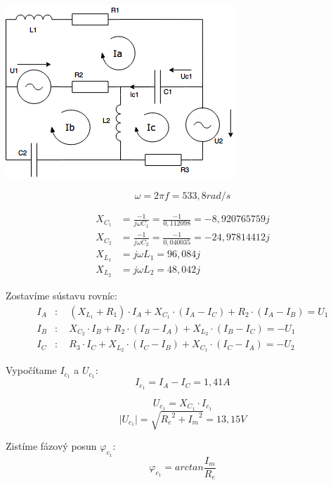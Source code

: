 \documentclass[a4paper,11pt,titlepage]{article}
\begin{document}
\vspace{5mm}

\includegraphics[scale=0.7]{diagra.png}

\vspace{5mm}

\[\omega = 2 \pi f = 533,8 rad/s\]

\begin{align*}
X_{C_1} &= \frac{-1}{j\omega C_1} = \frac{-1}{0,112098} = -8,920765759j \\[10pt]
X_{C_2} &= \frac{-1}{j\omega C_2} = \frac{-1}{0,040035} = -24,97814412j \\[20pt]
X_{L_1} &= j\omega L_1 = 96,084j \\[10pt]
X_{L_2} &= j\omega L_2 = 48,042j
\end{align*}

\vspace{5mm}

Zostavíme sústavu rovníc:
\begin{align*}
I_A &: \quad (X_{L_1} + R_1) \cdot I_A + X_{C_1} \cdot (I_A - I_C) + R_2 \cdot (I_A - I_B) = U_1 \\
I_B &: \quad X_{C_2} \cdot I_B + R_2 \cdot (I_B - I_A) + X_{L_2} \cdot (I_B - I_C) = -U_1 \\
I_C &: \quad R_3 \cdot I_C + X_{L_2} \cdot (I_C - I_B) + X_{C_1} \cdot (I_C - I_A) = -U_2
\end{align*}

\vspace{5mm}

Vypočítame $I_{c_1}$ a $U_{c_1}$:
\[I_{c_1} = I_A - I_C = 1,41A\]

\[U_{c_1} = X_{C_1} \cdot I_{c_1}\]
\[\mid U_{c_1} \mid = \sqrt{{R_e}^2 + {I_m}^2} = 13,15V\]

\vspace{5mm}

Zistíme fázový posun $\varphi_{c_1}$:
\[\varphi_{c_1} = arctan \frac{I_m}{R_e}\]
\end{document}
